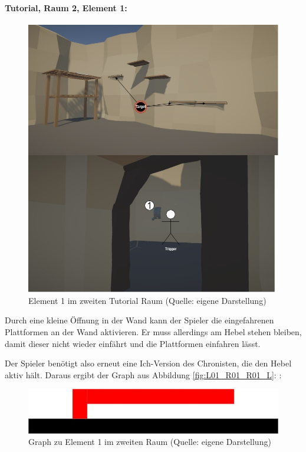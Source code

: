 \paragraph{Tutorial, Raum 2, Element 1:}

\begin{figure}[ht]
\centering
\includegraphics[width=0.8\linewidth]{content/pictures/Raetsel-L01_R02_R01.jpg}
\caption{Element 1 im zweiten Tutorial Raum (Quelle: eigene Darstellung)}
\label{fig:L01_R02_R01}
\end{figure}

Durch eine kleine Öffnung in der Wand kann der Spieler die eingefahrenen Plattformen an der Wand aktivieren. Er muss allerdings am Hebel stehen bleiben, damit dieser nicht wieder einfährt und die Plattformen einfahren lässt. 

Der Spieler benötigt also erneut eine Ich-Version des Chronisten, die den Hebel aktiv hält. Daraus ergibt der Graph aus Abbildung \ref{fig:L01_R01_R01_L}: :

\begin{figure}[ht]
\centering
\includegraphics[width=00.8\linewidth]{content/pictures/Raetsel-L01_R01_R01_Loesung.jpg}
\caption{Graph zu Element 1 im zweiten Raum (Quelle: eigene Darstellung)}
\label{fig:L01_R01_R01_L_}
\end{figure}

